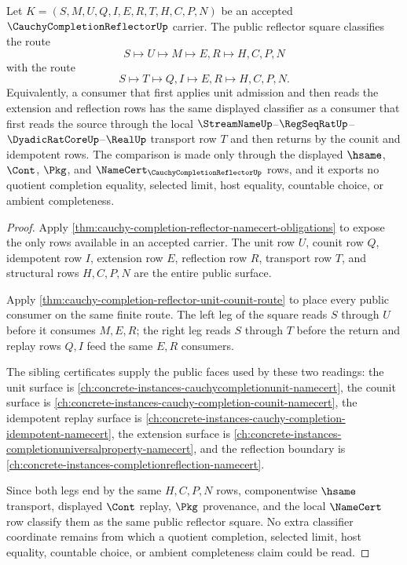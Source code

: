 \begin{theorem}
\label{thm:cauchy-completion-reflector-naturality-square}
Let $K=(S,M,U,Q,I,E,R,T,H,C,P,N)$ be an accepted $\CauchyCompletionReflectorUp$ carrier. The public reflector square classifies the route
$$
S\longmapsto U\longmapsto M\longmapsto E,R\longmapsto H,C,P,N
$$
with the route
$$
S\longmapsto T\longmapsto Q,I\longmapsto E,R\longmapsto H,C,P,N .
$$
Equivalently, a consumer that first applies unit admission and then reads the extension and reflection rows has the same displayed classifier as a consumer that first reads the source through the local $\StreamNameUp$--$\RegSeqRatUp$--$\DyadicRatCoreUp$--$\RealUp$ transport row $T$ and then returns by the counit and idempotent rows. The comparison is made only through the displayed $\hsame$, $\Cont$, $\Pkg$, and $\NameCert_{\CauchyCompletionReflectorUp}$ rows, and it exports no quotient completion equality, selected limit, host equality, countable choice, or ambient completeness.
\end{theorem}
\begin{proof}
Apply \autoref{thm:cauchy-completion-reflector-namecert-obligations} to expose the only rows available in an accepted carrier. The unit row $U$, counit row $Q$, idempotent row $I$, extension row $E$, reflection row $R$, transport row $T$, and structural rows $H,C,P,N$ are the entire public surface.

Apply \autoref{thm:cauchy-completion-reflector-unit-counit-route} to place every public consumer on the same finite route. The left leg of the square reads $S$ through $U$ before it consumes $M,E,R$; the right leg reads $S$ through $T$ before the return and replay rows $Q,I$ feed the same $E,R$ consumers.

The sibling certificates supply the public faces used by these two readings: the unit surface is \autoref{ch:concrete-instances-cauchycompletionunit-namecert}, the counit surface is \autoref{ch:concrete-instances-cauchy-completion-counit-namecert}, the idempotent replay surface is \autoref{ch:concrete-instances-cauchy-completion-idempotent-namecert}, the extension surface is \autoref{ch:concrete-instances-completionuniversalproperty-namecert}, and the reflection boundary is \autoref{ch:concrete-instances-completionreflection-namecert}.

Since both legs end by the same $H,C,P,N$ rows, componentwise $\hsame$ transport, displayed $\Cont$ replay, $\Pkg$ provenance, and the local $\NameCert$ row classify them as the same public reflector square. No extra classifier coordinate remains from which a quotient completion, selected limit, host equality, countable choice, or ambient completeness claim could be read.
\end{proof}

